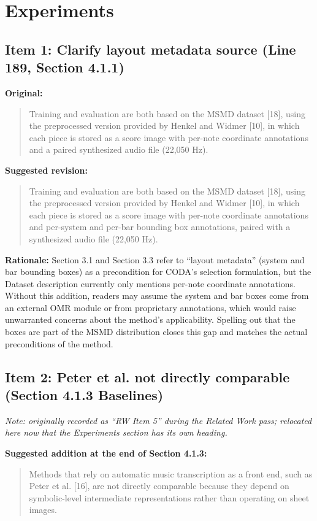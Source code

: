 \documentclass{article}
\begin{document}
\section*{Experiments}

\subsection*{Item 1: Clarify layout metadata source (Line 189, Section 4.1.1)}

\textbf{Original:}
\begin{quote}
Training and evaluation are both based on the MSMD dataset [18], using the preprocessed version provided by Henkel and Widmer [10], in which each piece is stored as a score image with per-note coordinate annotations and a paired synthesized audio file (22,050 Hz).
\end{quote}

\textbf{Suggested revision:}
\begin{quote}
Training and evaluation are both based on the MSMD dataset [18], using the preprocessed version provided by Henkel and Widmer [10], in which each piece is stored as a score image with per-note coordinate annotations and per-system and per-bar bounding box annotations, paired with a synthesized audio file (22,050 Hz).
\end{quote}

\textbf{Rationale:}
Section 3.1 and Section 3.3 refer to ``layout metadata'' (system and bar bounding boxes) as a precondition for CODA's selection formulation, but the Dataset description currently only mentions per-note coordinate annotations. Without this addition, readers may assume the system and bar boxes come from an external OMR module or from proprietary annotations, which would raise unwarranted concerns about the method's applicability. Spelling out that the boxes are part of the MSMD distribution closes this gap and matches the actual preconditions of the method.

\subsection*{Item 2: Peter et al. not directly comparable (Section 4.1.3 Baselines)}

\textit{Note: originally recorded as ``RW Item 5'' during the Related Work pass; relocated here now that the Experiments section has its own heading.}

\textbf{Suggested addition at the end of Section 4.1.3:}
\begin{quote}
Methods that rely on automatic music transcription as a front end, such as Peter et al. [16], are not directly comparable because they depend on symbolic-level intermediate representations rather than operating on sheet images.
\end{quote}
\end{document}
